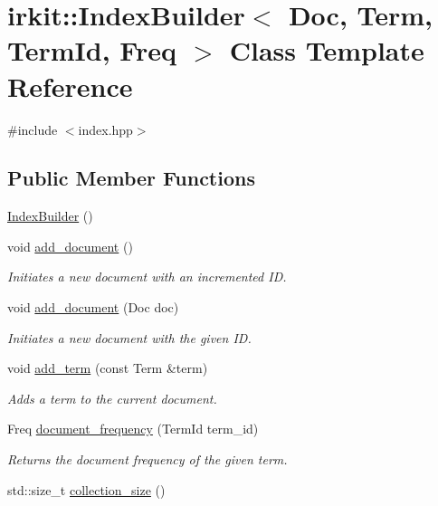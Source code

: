 \hypertarget{classirkit_1_1IndexBuilder}{}\section{irkit\+:\+:Index\+Builder$<$ Doc, Term, Term\+Id, Freq $>$ Class Template Reference}
\label{classirkit_1_1IndexBuilder}


{\ttfamily \#include $<$index.\+hpp$>$}

\subsection*{Public Member Functions}
\begin{DoxyCompactItemize}
\item 
\hyperlink{classirkit_1_1IndexBuilder_ab56476b7728ed2618b8de7511dfe2427}{Index\+Builder} ()
\item 
void \hyperlink{classirkit_1_1IndexBuilder_a8a18c112d48e21a89aefa9a931a536ab}{add\+\_\+document} ()
\begin{DoxyCompactList}\small\item\em Initiates a new document with an incremented ID. \end{DoxyCompactList}\item 
void \hyperlink{classirkit_1_1IndexBuilder_a31b062283c9b7203ce4a65a5bd744fae}{add\+\_\+document} (Doc doc)
\begin{DoxyCompactList}\small\item\em Initiates a new document with the given ID. \end{DoxyCompactList}\item 
void \hyperlink{classirkit_1_1IndexBuilder_a6005b21c9a24cb54fe54957e21c0487a}{add\+\_\+term} (const Term \&term)
\begin{DoxyCompactList}\small\item\em Adds a term to the current document. \end{DoxyCompactList}\item 
Freq \hyperlink{classirkit_1_1IndexBuilder_ac4c8613d07637de4b67d61df2910bbd0}{document\+\_\+frequency} (Term\+Id term\+\_\+id)
\begin{DoxyCompactList}\small\item\em Returns the document frequency of the given term. \end{DoxyCompactList}\item 
std\+::size\+\_\+t \hyperlink{classirkit_1_1IndexBuilder_a81221fd5879c7d68d4d6bff6005b8cd7}{collection\+\_\+size} ()

\end{DoxyCompactItemize}

